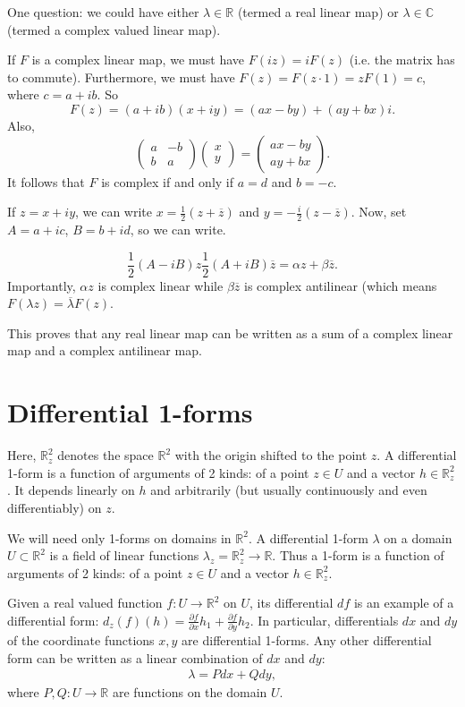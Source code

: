 \documentclass[12pt]{article}
\newcommand{\RR}{\mathbb{R}}
\newcommand{\CC}{\mathbb{C}}
\newcommand{\ol}{\overline}
\newcommand*{\mat}[1]{\begin{pmatrix}#1\end{pmatrix}}
\def\CC{\mathbb{C}}
\newcommand*{\mat}[1]{\begin{pmatrix}#1\end{pmatrix}}
\begin{document}
  One question: we could have either $\lambda \in \RR$ (termed a real linear map) or $\lambda \in \CC$ (termed a complex valued linear map).

  If $F$ is a complex linear map, we must have $F(iz) = i F(z)$ (i.e. the matrix has to commute).  Furthermore, we must have $F(z) = F(z \cdot 1) = z F(1) = c$, where $c = a+ib$.  So
  \[
    F(z) = (a+ib) (x+iy) = (ax - by) + (ay + bx)i.
    \]
    Also,
    \[
      \mat{a & -b \\ b & a} \mat{x \\ y} = \mat{ax - by \\ ay + bx}.
      \]
      It follows that $F$ is complex if and only if $a = d$ and $b = -c$.


      If $z = x+iy$, we can write $x = \frac{1}{2} (z + \ol{z})$ and $y = - \frac{i}{2} (z - \ol{z})$.  Now, set $A = a+ic$, $B = b + id$, so we can write.

      \[
        \frac{1}{2} (A - iB) z  \frac{1}{2} (A + iB) \ol{z} = \alpha z + \beta \ol{z}.
      \]
      Importantly, $\alpha z$ is complex linear while $\beta \ol{z}$ is complex antilinear (which means $F(\lambda z) = \ol{\lambda} F(z)$.

        This proves that any real linear map can be written as a sum of a complex linear map and a complex antilinear map.

        \newpage

        \section{Differential 1-forms}

        Here, $\RR^2_z$ denotes the space $\RR^2$ with the origin shifted to the point $z$.  A differential 1-form is a function of arguments of 2 kinds: of a point $z \in U$ and a vector $h \in \RR_z^2$.  It depends linearly on $h$ and arbitrarily (but usually continuously and even differentiably) on $z$.

        We will need only 1-forms on domains in $\RR^2$.  A differential 1-form $\lambda$ on a domain $U \subset \RR^2$ is a field of linear functions $\lambda_{z} = \RR_z^2 \to \RR$.  Thus a 1-form is a function of arguments of 2 kinds: of a point $z \in U$ and a vector $h \in \RR_z^2$.  

        Given a real valued function $f: U \to \RR^2$ on $U$, its differential $df$ is an example of a differential form: $d_z(f)(h) = \frac{\partial f}{\partial x} h_1 + \frac{\partial f}{\partial y} h_2$.  In particular, differentials $dx$ and $dy$ of the coordinate functions $x, y$ are differential 1-forms.  Any other differential form can be written as a linear combination of $dx$ and $dy$:
        \begin{align*}
          \lambda = P dx +  Q dy,
        \end{align*}
        where $P, Q: U \to \RR$ are functions on the domain $U$.
\end{document}
